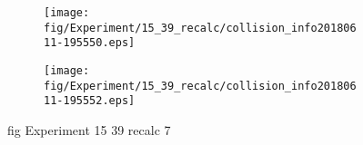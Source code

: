 \begin{figure}[H]
	\centering
	\begin{subfigure}[b]{0.9\textwidth}
		\texttt{[image: fig/Experiment/15\_39\_recalc/collision\_info20180611-195550.eps]}
		\caption{}
		\label{fig:Experiment:15_39_recalc:collision_info20180611-195550}
	\end{subfigure}

	\begin{subfigure}[b]{0.9\textwidth}
		\texttt{[image: fig/Experiment/15\_39\_recalc/collision\_info20180611-195552.eps]}
		\caption{}
		\label{fig:Experiment:15_39_recalc:collision_info20180611-195552}
	\end{subfigure}
	\caption{fig Experiment 15 39 recalc 7}
	\label{fig:Experiment:15_39_recalc:7}
\end{figure}


